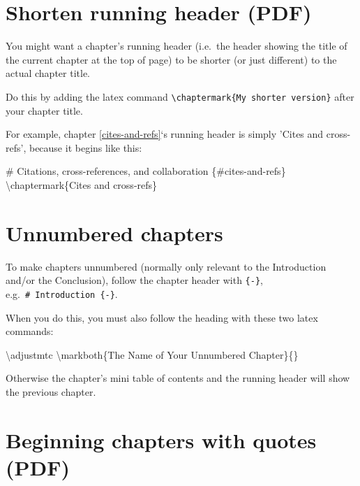 \documentclass[a4paper, nobind]{templates/ociamthesis}
\newenvironment{Shaded}{\begin{snugshade}}{\end{snugshade}}
\newcommand{\FunctionTok}[1]{\textcolor[rgb]{0.00,0.00,0.00}{#1}}
\newcommand{\NormalTok}[1]{#1}
\renewenvironment{Shaded}
{
  \vspace{10pt}%
  \begin{snugshade}%
}{%
  \end{snugshade}%
  \vspace{8pt}%
}
\begin{document}
\hypertarget{shorten-running-header-pdf}{%
\section{Shorten running header (PDF)}\label{shorten-running-header-pdf}}

You might want a chapter's running header (i.e.~the header showing the title of the current chapter at the top of page) to be shorter (or just different) to the actual chapter title.

Do this by adding the latex command \texttt{\textbackslash{}chaptermark\{My\ shorter\ version\}} after your chapter title.

For example, chapter \ref{cites-and-refs}`s running header is simply 'Cites and cross-refs', because it begins like this:

\begin{Shaded}
\begin{Highlighting}[]
\FunctionTok{\# Citations, cross{-}references, and collaboration \{\#cites{-}and{-}refs\} }
\NormalTok{\textbackslash{}chaptermark\{Cites and cross{-}refs\}}
\end{Highlighting}
\end{Shaded}

\hypertarget{unnumbered-chapters}{%
\section{Unnumbered chapters}\label{unnumbered-chapters}}

To make chapters unnumbered (normally only relevant to the Introduction and/or the Conclusion), follow the chapter header with \texttt{\{-\}}, e.g.~\texttt{\#\ Introduction\ \{-\}}.

When you do this, you must also follow the heading with these two latex commands:

\begin{Shaded}
\begin{Highlighting}[]
\FunctionTok{\textbackslash{}adjustmtc}
\FunctionTok{\textbackslash{}markboth}\NormalTok{\{The Name of Your Unnumbered Chapter\}\{\}}
\end{Highlighting}
\end{Shaded}

Otherwise the chapter's mini table of contents and the running header will show the previous chapter.

\hypertarget{beginning-chapters-with-quotes-pdf}{%
\section{Beginning chapters with quotes (PDF)}\label{beginning-chapters-with-quotes-pdf}}
\end{document}
